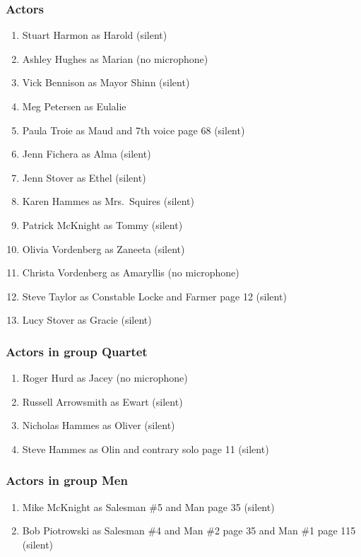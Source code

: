 \subsubsection{Actors}
\begin{enumerate}
\item Stuart Harmon as Harold (silent)
\item Ashley Hughes as Marian (no microphone)
\item Vick Bennison as Mayor Shinn (silent)
\item Meg Petersen as Eulalie
\item Paula Troie as Maud and 7th voice page 68 (silent)
\item Jenn Fichera as Alma (silent)
\item Jenn Stover as Ethel (silent)
\item Karen Hammes as Mrs.~Squires (silent)
\item Patrick McKnight as Tommy (silent)
\item Olivia Vordenberg as Zaneeta (silent)
\item Christa Vordenberg as Amaryllis (no microphone)
\item Steve Taylor as Constable Locke and Farmer page 12 (silent)
\item Lucy Stover as Gracie (silent)
\end{enumerate}
\subsubsection{Actors in group Quartet}
\begin{enumerate}
\item Roger Hurd as Jacey (no microphone)
\item Russell Arrowsmith as Ewart (silent)
\item Nicholas Hammes as Oliver (silent)
\item Steve Hammes as Olin and contrary solo page 11 (silent)
\end{enumerate}
\subsubsection{Actors in group Men}
\begin{enumerate}
\item Mike McKnight as Salesman \#5 and Man page 35 (silent)
\item Bob Piotrowski as Salesman \#4 and Man \#2 page 35 and Man \#1 page 115 (silent)
\end{enumerate}

